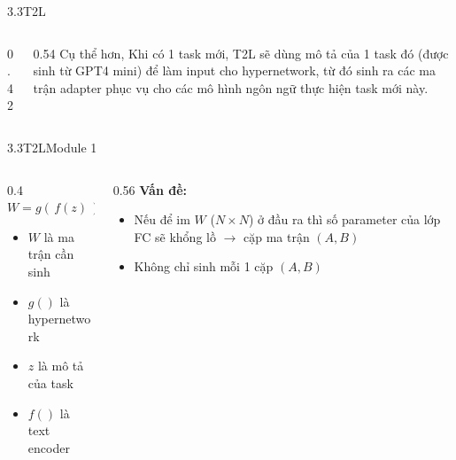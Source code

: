 \begin{frame}{3.3\quad T2L}
  \begin{columns}[c,onlytextwidth]
    \begin{column}{0.42\textwidth}
      \centering{}
    \end{column}
    \begin{column}{0.54\textwidth}
      \justifying\large
      Cụ thể hơn, Khi có 1 task mới, T2L sẽ dùng mô tả của 1 task đó (được sinh từ GPT4
      mini) để làm input cho hypernetwork, từ đó sinh ra các ma trận adapter phục vụ cho
      các mô hình ngôn ngữ thực hiện task mới này.
    \end{column}
  \end{columns}
\end{frame}

\begin{frame}{3.3\quad T2L}{Module 1}
  \centering{}\par
  \vspace{0.6em}
  \raggedright
  \begin{columns}[T,onlytextwidth]
    \begin{column}{0.4\textwidth}
      {\large $W = g(\,f(z)\,)$}
      \begin{itemize}\tightlist
        \item $W$ là ma trận cần sinh
        \item $g()$ là hypernetwork
        \item $z$ là mô tả của task
        \item $f()$ là text encoder
      \end{itemize}
    \end{column}
    \begin{column}{0.56\textwidth}
      \textbf{Vấn đề:}
      \begin{itemize}\tightlist
        \item Nếu để im $W$ ($N\times N$) ở đầu ra thì số parameter của lớp FC sẽ khổng lồ
              $\rightarrow$ cặp ma trận $(A,B)$
        \item Không chỉ sinh mỗi 1 cặp $(A,B)$
      \end{itemize}
    \end{column}
  \end{columns}
\end{frame}

